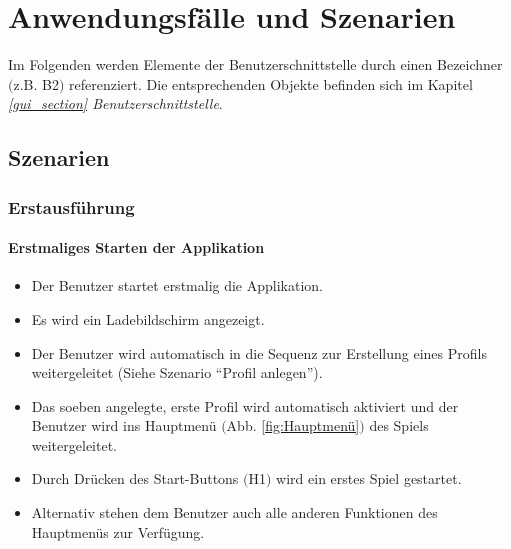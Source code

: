 \section{Anwendungsfälle und Szenarien}

Im Folgenden werden Elemente der Benutzerschnittstelle durch einen Bezeichner $($z.B. B2$)$ referenziert. Die entsprechenden Objekte befinden sich im Kapitel \textit{\ref{gui_section} Benutzerschnittstelle}.

\subsection{Szenarien}


\subsubsection{Erstausführung}
\paragraph{Erstmaliges Starten der Applikation}
\begin{itemize}
	\item Der Benutzer startet erstmalig die Applikation.
	\item Es wird ein Ladebildschirm angezeigt.
	\item Der Benutzer wird automatisch in die Sequenz zur Erstellung eines Profils weitergeleitet (Siehe Szenario "`Profil anlegen"').
	\item Das soeben angelegte, erste Profil wird automatisch aktiviert und der Benutzer wird ins Hauptmenü $($Abb. \ref{fig:Hauptmenü}$)$ des Spiels weitergeleitet.
	\item Durch Drücken des Start-Buttons $($H1$)$ wird ein erstes Spiel gestartet.
	\item Alternativ stehen dem Benutzer auch alle anderen Funktionen des Hauptmenüs zur Verfügung.
\end{itemize}
